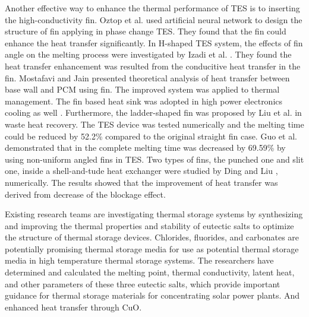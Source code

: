 \documentclass[preprint,12pt]{elsarticle}
\begin{document}
Another effective way to enhance the thermal performance of TES is to inserting the high-conductivity fin. Oztop et al. \cite{RN1224} used artificial neural network to design the structure of fin applying in phase change TES. They found that the fin could enhance the heat transfer significantly. In H-shaped TES system, the effects of fin angle on the melting process were investigated by Izadi et al. \cite{RN1231}. They found the heat transfer enhancement was resulted from the conducitive heat transfer in the fin. Mostafavi and Jain \cite{RN1225} presented theoretical analysis of heat transfer between base wall and PCM using fin. The improved system was applied to thermal management. The fin based heat sink was adopted in high power electronics cooling as well \cite{RN1232}. Furthermore, the ladder-shaped fin was proposed by Liu et al. \cite{RN1227} in waste heat recovery. The TES device was tested numerically and the melting time could be reduced by 52.2\% compared to the original straight fin case. Guo et al. \cite{RN1226} demonstrated that in the complete melting time was decreased by 69.59\% by using non-uniform angled fins in TES. Two types of fins, the punched one and slit one, inside a shell-and-tude heat exchanger were studied by Ding and Liu \cite{RN1230}, numerically. The results showed that the improvement of heat transfer was derived from decrease of the blockage effect.

Existing research teams are investigating thermal storage systems by synthesizing and improving the thermal properties and stability of eutectic salts to optimize the structure of thermal storage devices. Chlorides, fluorides, and carbonates are potentially promising thermal storage media for use as potential thermal storage media in high temperature thermal storage systems\cite{Wang2023ARO}. The researchers have determined and calculated the melting point, thermal conductivity, latent heat, and other parameters of these three eutectic salts\cite{Wang2023ComprehensivePO,Wu2023ThermodynamicCA}, which provide important guidance for thermal storage materials for concentrating solar power plants. And enhanced heat transfer through CuO\cite{Wu2023ComprehensiveTP}.
\end{document}
